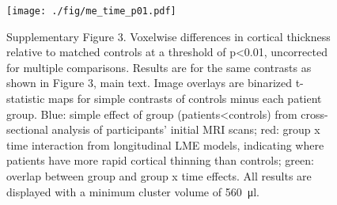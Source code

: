 \documentclass[]{article}
\begin{document}
\begin{figure}[]

{\centering \texttt{[image: ./fig/me\_time\_p01.pdf]} 

}

\caption[GM time effects]{Supplementary Figure 3. Voxelwise differences in cortical thickness relative to matched controls at a threshold of p<0.01, uncorrected for multiple comparisons. Results are for the same contrasts as shown in Figure 3, main text. Image overlays are binarized t-statistic maps for simple contrasts of controls minus each patient group. Blue: simple effect of group (patients<controls) from cross-sectional analysis of participants' initial MRI scans; red: group x time interaction from longitudinal LME models, indicating where patients have more rapid cortical thinning than controls; green: overlap between group and group x time effects. All results are displayed with a minimum cluster volume of \SI{560}{\micro\litre}. \label{gm_me_time}}

\end{figure}
\end{document}
